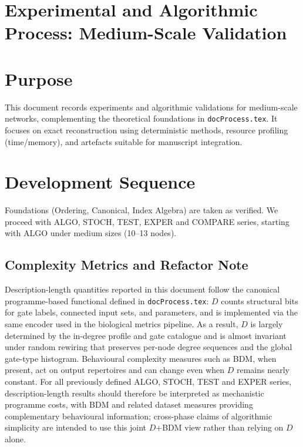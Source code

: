 \documentclass{article}
\begin{document}
\section{Experimental and Algorithmic Process: Medium-Scale Validation}



\clearpage

\section{Purpose}
This document records experiments and algorithmic validations for medium-scale networks, complementing the theoretical foundations in \texttt{docProcess.tex}. It focuses on exact reconstruction using deterministic methods, resource profiling (time/memory), and artefacts suitable for manuscript integration.

\section{Development Sequence}
Foundations (Ordering, Canonical, Index Algebra) are taken as verified. We proceed with ALGO, STOCH, TEST, EXPER and COMPARE series, starting with ALGO under medium sizes (10--13 nodes).

\subsection*{Complexity Metrics and Refactor Note}
Description-length quantities reported in this document follow the canonical programme-based functional defined in \texttt{docProcess.tex}: \(D\) counts structural bits for gate labels, connected input sets, and parameters, and is implemented via the same encoder used in the biological metrics pipeline. As a result, \(D\) is largely determined by the in-degree profile and gate catalogue and is almost invariant under random rewiring that preserves per-node degree sequences and the global gate-type histogram. Behavioural complexity measures such as BDM, when present, act on output repertoires and can change even when \(D\) remains nearly constant. For all previously defined ALGO, STOCH, TEST and EXPER series, description-length results should therefore be interpreted as mechanistic programme costs, with BDM and related dataset measures providing complementary behavioural information; cross-phase claims of algorithmic simplicity are intended to use this joint \(D\)+BDM view rather than relying on \(D\) alone.\\
\end{document}
